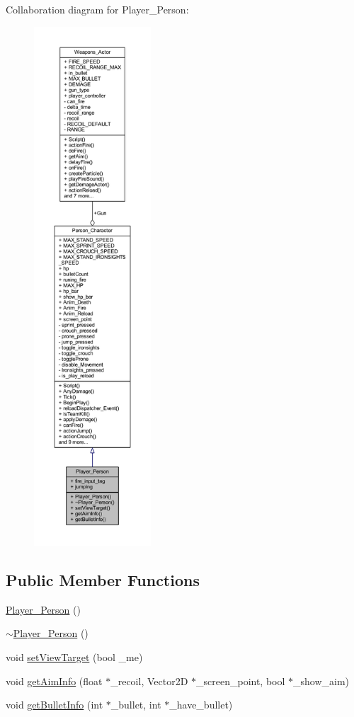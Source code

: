 Collaboration diagram for Player\+\_\+\+Person\+:\nopagebreak
\begin{figure}[H]
\begin{center}
\leavevmode
\includegraphics[height=550pt]{class_player___person__coll__graph}
\end{center}
\end{figure}
\subsection*{Public Member Functions}
\begin{DoxyCompactItemize}
\item 
\hyperlink{class_player___person_a3f466e7d7e79ca4e178e660719c48777}{Player\+\_\+\+Person} ()
\item 
\hyperlink{class_player___person_ab4c1f8d76f85d1a4f6b21ed49ee2a1b4}{$\sim$\+Player\+\_\+\+Person} ()
\item 
void \hyperlink{class_player___person_a2719b6d6bb77d38be7cf5e5f677ade24}{set\+View\+Target} (bool \+\_\+me)
\item 
void \hyperlink{class_player___person_a9d2fb283896181096721f63cca4fbaf1}{get\+Aim\+Info} (float $\ast$\+\_\+recoil, Vector2D $\ast$\+\_\+screen\+\_\+point, bool $\ast$\+\_\+show\+\_\+aim)
\item 
void \hyperlink{class_player___person_aab48e1eb2c70ac97cf6c5cee99e19b21}{get\+Bullet\+Info} (int $\ast$\+\_\+bullet, int $\ast$\+\_\+have\+\_\+bullet)
\end{DoxyCompactItemize}
